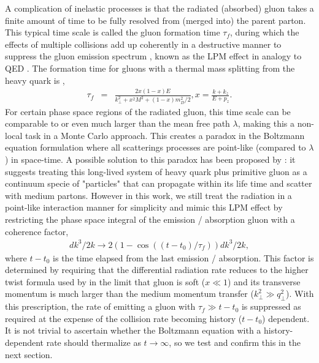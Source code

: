 \documentclass[aps, prc, reprint, amsmath, groupedaddress, nofootinbib]{revtex4-1}
\begin{document}
A complication of inelastic processes is that the radiated (absorbed) gluon takes a finite amount of time to be fully resolved from (merged into) the parent parton.
This typical time scale is called the gluon formation time $\tau_f$, during which the effects of multiple collisions add up coherently in a destructive manner to suppress the gluon emission spectrum \cite{Wang:1994fx, Baier:1996kr, Zakharov:1996fv}, known as the LPM effect in analogy to QED \cite{PhysRev.103.1811}.
The formation time for gluons with a thermal mass splitting from the heavy quark is \cite{Cao:2013ita},
\begin{eqnarray}
\tau_f &=& \frac{2x(1-x)E}{k_\perp^2 + x^2M^2 + (1-x)m_D^2/2}, x = \frac{k+k_z}{E+p_z}.
\end{eqnarray}
For certain phase space regions of the radiated gluon, this time scale can be comparable to or even much larger than the mean free path $\lambda$, making this a non-local task in a Monte Carlo approach.
This creates a paradox in the Boltzmann equation formulation where all scatterings processes are point-like (compared to $\lambda$) in space-time.
A possible solution to this paradox has been proposed by \cite{ColemanSmith:2012vr}: it suggests treating this long-lived system of heavy quark plus primitive gluon as a continuum specie of "particles" that can propagate within its life time and scatter with medium partons.
However in this work, we still treat the radiation in a point-like interaction manner for simplicity and mimic this LPM effect by restricting the phase space integral of the emission / absorption gluon with a coherence factor,
\begin{eqnarray}\label{eq:LPM}
dk^3/2k \rightarrow 2\left(1 - \cos\left((t-t_0)/\tau_f\right) \right)dk^3/2k,
\end{eqnarray}
where $t-t_0$ is the time elapsed from the last emission / absorption.
This factor is determined by requiring that the differential radiation rate reduces to the higher twist formula used by \cite{Cao:2013ita} in the limit that gluon is soft ($x\ll 1$) and its transverse momentum is much larger than the medium momentum transfer ($k_\perp^2 \gg q_\perp^2$).
With this prescription, the rate of emitting a gluon with $\tau_f \gg t-t_0$ is suppressed as required at the expense of the collision rate becoming history ($t-t_0$) dependent.
It is not trivial to ascertain whether the Boltzmann equation with a history-dependent rate should thermalize as $t\rightarrow \infty$, so we test and confirm this in the next section.
\end{document}
